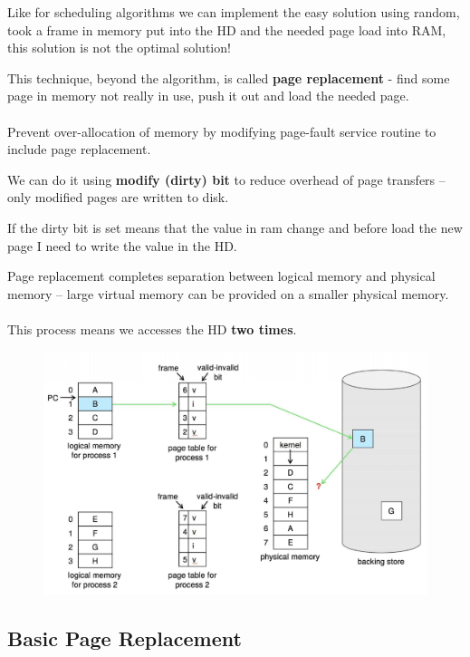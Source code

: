 Like for scheduling algorithms we can implement the easy solution using random, took a frame in memory put into the HD and the needed page load into RAM, this solution is not the optimal solution!

This technique, beyond the algorithm, is called \textbf{page replacement} - find some page in memory not really in use, push it out and load the needed page.

\paragraph{}
Prevent over-allocation of memory by modifying page-fault service
routine to include page replacement. 

We can do it using \textbf{modify (dirty) bit} to reduce overhead of page transfers – only
modified pages are written to disk.

If the dirty bit is set means that the value in ram change and before load the new page I need to write the value in the HD.

Page replacement completes separation between logical memory and
physical memory – large virtual memory can be provided on a smaller
physical memory.

\paragraph{}

This process means we accesses the HD \textbf{two times}.


\begin{figure}[htbp]
    \centering
    \includegraphics[width=0.75\linewidth]{img/sdfbgv.png}
\end{figure}

\newpage
\subsection{Basic Page Replacement}

